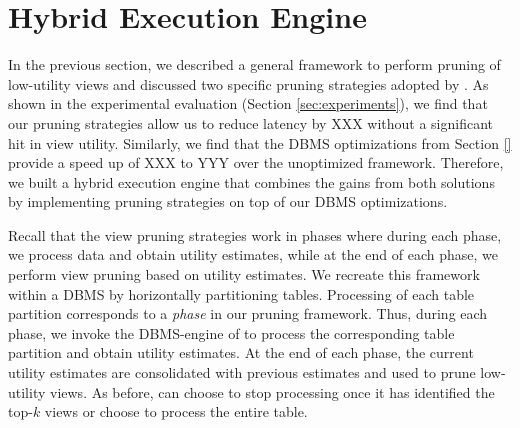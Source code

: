 \section{Hybrid Execution Engine}
\label{sec:hybrid_exectution_engine}

In the previous section, we described a general framework to perform pruning of low-utility views and discussed two specific pruning strategies adopted by \SeeDB.
As shown in the experimental evaluation (Section \ref{sec:experiments}), we find that
our pruning strategies allow us to reduce latency by XXX without a significant hit in view utility.
Similarly, we find that the DBMS optimizations from Section \ref{} provide a speed up of XXX to YYY over the unoptimized framework. 
Therefore, we built a hybrid execution engine that combines the gains from both solutions by implementing pruning strategies on top of our DBMS optimizations. 


Recall that the view pruning strategies work in phases where during each phase, we process data and obtain utility estimates, while at the end of each phase, we perform view pruning based on utility estimates.
We recreate this framework within a DBMS by horizontally partitioning tables.
Processing of each table partition corresponds to a {\it phase} in our pruning framework. 
Thus, during each phase, we invoke the DBMS-engine of \SeeDB to process the corresponding table partition and obtain utility estimates.
At the end of each phase, the current utility estimates are consolidated with previous estimates and used to prune low-utility views.
As before, \SeeDB can choose to stop processing once it has identified the top-$k$ views or choose to process the entire table.



